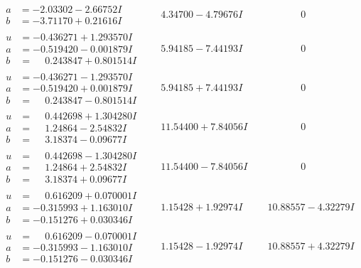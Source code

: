 \documentclass[1p]{elsarticle_modified}
\theoremstyle{definition}
\begin{document}
$$\begin{array}{c|c|c}
\begin{aligned}
a &= -2.03302 - 2.66752 I \\
b &= -3.71170 + 0.21616 I\end{aligned}
 & \phantom{-}4.34700 - 4.79676 I & \phantom{-0.000000 } 0 \\ \hline\begin{aligned}
u &= -0.436271 + 1.293570 I \\
a &= -0.519420 - 0.001879 I \\
b &= \phantom{-}0.243847 + 0.801514 I\end{aligned}
 & \phantom{-}5.94185 - 7.44193 I & \phantom{-0.000000 } 0 \\ \hline\begin{aligned}
u &= -0.436271 - 1.293570 I \\
a &= -0.519420 + 0.001879 I \\
b &= \phantom{-}0.243847 - 0.801514 I\end{aligned}
 & \phantom{-}5.94185 + 7.44193 I & \phantom{-0.000000 } 0 \\ \hline\begin{aligned}
u &= \phantom{-}0.442698 + 1.304280 I \\
a &= \phantom{-}1.24864 - 2.54832 I \\
b &= \phantom{-}3.18374 - 0.09677 I\end{aligned}
 & \phantom{-}11.54400 + 7.84056 I & \phantom{-0.000000 } 0 \\ \hline\begin{aligned}
u &= \phantom{-}0.442698 - 1.304280 I \\
a &= \phantom{-}1.24864 + 2.54832 I \\
b &= \phantom{-}3.18374 + 0.09677 I\end{aligned}
 & \phantom{-}11.54400 - 7.84056 I & \phantom{-0.000000 } 0 \\ \hline\begin{aligned}
u &= \phantom{-}0.616209 + 0.070001 I \\
a &= -0.315993 + 1.163010 I \\
b &= -0.151276 + 0.030346 I\end{aligned}
 & \phantom{-}1.15428 + 1.92974 I & \phantom{-}10.88557 - 4.32279 I \\ \hline\begin{aligned}
u &= \phantom{-}0.616209 - 0.070001 I \\
a &= -0.315993 - 1.163010 I \\
b &= -0.151276 - 0.030346 I\end{aligned}
 & \phantom{-}1.15428 - 1.92974 I & \phantom{-}10.88557 + 4.32279 I\\

\end{array}$$
\end{document}
